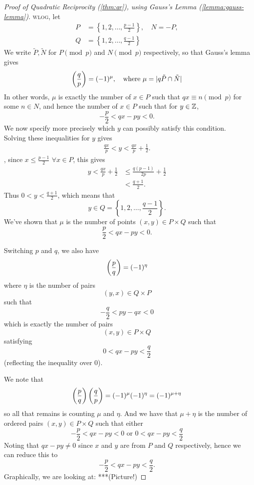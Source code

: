 \begin{proof}[Proof of Quadratic Reciprocity (\cref{thm:qr}), using Gauss's Lemma (\cref{lemma:gauss-lemma})]
    \textsc{wlog}, let
    \begin{align*}
        P & = \left\{1, 2, \dots, \frac{p-1}{2}\right\},\quad N=-P, \\
        Q & = \left\{1, 2, \dots, \frac{q-1}{2}\right\}
    \end{align*}
    We write $\tilde P, \tilde N$ for $P\pmod{p}$ and $N\pmod{p}$ respectively, so that Gauss's lemma gives
    \[\left(\dfrac{q}{p}\right) = (-1)^\mu, \quad\text{where }\mu = |q\tilde P\cap\tilde N|\]
    In other words, $\mu$ is exactly the number of $x\in P$ such that $qx\equiv n\pmod{p}$ for some $n\in N$, and hence the number of $x\in P$ such that for $y\in \mathbb Z$, \[-\frac{p}{2} < qx - py < 0.\]
    We now specify more precisely which $y$ can possibly satisfy this condition. Solving these inequalities for $y$ gives
    \begin{align*}
        \frac{qx}{p} < y < \frac{qx}{p}+\frac{1}{2}.
    \end{align*}
    \otoh, since $x\leq \frac{p-1}{2}$ $\forall x\in P$, this gives
    \begin{align*}
        y < \frac{qx}{p}+\frac{1}{2} & \leq \frac{q(p-1)}{2p}+\frac{1}{2} \\
                                     & < \frac{q+1}{2}.
    \end{align*}
    Thus $0 < y < \frac{q+1}{2}$, which means that
    \[y\in Q = \left\{1, 2, \dots, \frac{q-1}{2}\right\}.\]
    We've shown that $\mu$ is the number of points $(x, y)\in P\times Q$ such that
    \[\frac{p}{2} < qx - py < 0.\]

    Switching $p$ and $q$, we also have
    \[\left(\dfrac{p}{q}\right) = (-1)^\eta\]
    where $\eta$ is the number of pairs
    \[(y, x)\in Q\times P\]
    such that
    \[-\frac{q}{2} < py - qx < 0\]
    which is exactly the number of pairs
    \[(x, y)\in P\times Q\]
    satisfying
    \[0 < qx - py < \frac{q}{2}\]
    (reflecting the inequality over $0$).

    We note that
    \[\left(\dfrac{p}{q}\right)\left(\dfrac{q}{p}\right) = (-1)^\mu (-1)^\eta = (-1)^{\mu+\eta}\]
    so all that remains is counting $\mu$ and $\eta$. And we have that $\mu + \eta$ is the number of ordered pairs $(x, y)\in P\times Q$ such that either
    \[-\frac{p}{2} < qx - py < 0 \text{ or } 0 < qx - py < \frac{q}{2}\]
    Noting that $qx - py\neq 0$ since $x$ and $y$ are from $P$ and $Q$ respectively, hence we can reduce this to
    \[-\frac{p}{2} < qx - py < \frac{q}{2}.\]
    Graphically, we are looking at:
    ***(Picture!)


\end{proof}
